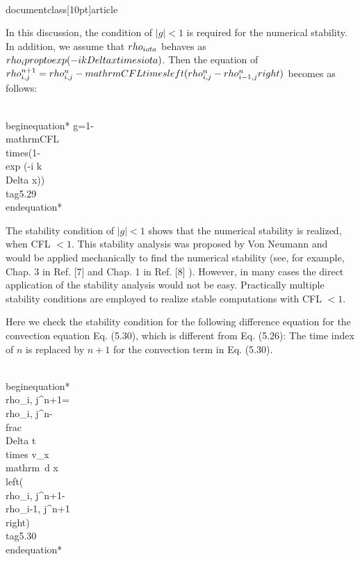 \\documentclass[10pt]{article}
\begin{document}
{In this discussion, the condition of $|g|<1$ is required for the numerical stability. In addition, we assume that $\\rho_{\\iota}$ behaves as $\\rho_{i} \\propto \\exp (-i k \\Delta x \\times \\iota)$. Then the equation of $\\rho_{i, j}^{n+1}=\\rho_{i, j}^{n}-\\mathrm{CFL} \\times\\left(\\rho_{i, j}^{n}-\\rho_{i-1, j}^{n}\\right)$ becomes as follows:


\\begin{equation*}
g=1-\\mathrm{CFL} \\times(1-\\exp (-i k \\Delta x)) \\tag{5.29}
\\end{equation*}


The stability condition of $|g|<1$ shows that the numerical stability is realized, when CFL $<1$. This stability analysis was proposed by Von Neumann and would be applied mechanically to find the numerical stability (see, for example, Chap. 3 in Ref. [7] and Chap. 1 in Ref. [8] ). However, in many cases the direct application of the stability analysis would not be easy. Practically multiple stability conditions are employed to realize stable computations with CFL $<1$.

Here we check the stability condition for the following difference equation for the convection equation Eq. (5.30), which is different from Eq. (5.26): The time index of $n$ is replaced by $n+1$ for the convection term in Eq. (5.30).


\\begin{equation*}
\\rho_{i, j}^{n+1}=\\rho_{i, j}^{n}-\\frac{\\Delta t \\times v_{x}}{\\mathrm{~d} x}\\left(\\rho_{i, j}^{n+1}-\\rho_{i-1, j}^{n+1}\\right) \\tag{5.30}
\\end{equation*}


}
\end{document}
